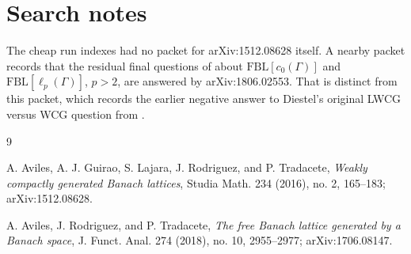 \documentclass[11pt]{amsart}
\newcommand{\FBL}{\mathrm{FBL}}
\begin{document}
\section*{Search notes}

The cheap run indexes had no packet for arXiv:1512.08628 itself.  A nearby
packet records that the residual final questions of \cite{ART2017} about
\(\FBL[c_0(\Gamma)]\) and \(\FBL[\ell_p(\Gamma)]\), \(p>2\), are answered by
arXiv:1806.02553.  That is distinct from this packet, which records the
earlier negative answer to Diestel's original LWCG versus WCG question from
\cite{AGLRT2016}.

\begin{thebibliography}{9}

A. Aviles, A. J. Guirao, S. Lajara, J. Rodriguez, and P. Tradacete,
\emph{Weakly compactly generated Banach lattices},
Studia Math. 234 (2016), no. 2, 165--183; arXiv:1512.08628.

A. Aviles, J. Rodriguez, and P. Tradacete,
\emph{The free Banach lattice generated by a Banach space},
J. Funct. Anal. 274 (2018), no. 10, 2955--2977; arXiv:1706.08147.

\end{thebibliography}
\end{document}
